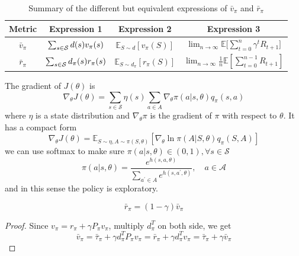 \documentclass[10pt]{elegantbook}
\begin{document}
\begin{table}[ht]
\centering
\caption{Summary of the different but equivalent expressions of $\bar{v}_{\pi}$ and $\bar r_{\pi}$}
\begin{tabular}{cccc}
\toprule
Metric & Expression 1 & Expression 2 & Expression 3 \\
\midrule
$\bar{v}_{\pi}$ & $\sum_{s\in{\cal S}}d(s)v_{\pi}(s)$       & $\mathbb{E}_{S\sim d}[v_{\pi}(S)]$        & $\lim_{n\rightarrow\infty}\mathbb{E} \big [ \sum_{t=0}^{n}\gamma^{t}R_{t+1} \big ]$ \\
\midrule
$\bar r_{\pi}$  & $\sum_{s\in{\cal S}}d_{\pi}(s)r_{\pi}(s)$ & $\mathbb E_{S\sim d_{\pi}}[r_{\pi}({S})]$ & $\operatorname*{lim}_{n\rightarrow\infty}\frac{1}{n} \mathbb E \left[\sum_{t=0}^{n-1}R_{t+1}\right]$ \\
\bottomrule
\end{tabular}
\end{table}

\begin{theorem}
    The gradient of $J(\theta)$ is
    \begin{equation}
        \nabla_{\theta}J(\theta)=\sum_{s\in{\mathcal{S}}}\eta(s)\sum_{a\in A}\nabla_{\theta}\pi(a|s,\theta)q_{\pi}(s,a)
    \end{equation}
    where $\eta$ is a state distribution and $\nabla_{\theta}\pi$ is the gradient of $\pi$ with respect to $\theta$. It has a compact form
    \begin{equation}
        \nabla_{\theta}J(\theta)=\mathbb{E}_{S\sim\eta,A\sim\pi(S,\theta)}\left[\nabla_{\theta}\ln\pi(A|S,\theta)q_{\pi}(S,A)\right]
    \end{equation}
    we can use softmax to make sure $\pi(a | s,\theta) \in (0, 1), \forall s \in \mathcal S$
    \begin{equation}
        \pi(a|s,\theta)=\frac{e^{h(s,a,\theta)}}{\sum_{a^{\prime}\in A}e^{h(s,a^{\prime},\theta)}},\quad a\in\mathcal{A}
    \end{equation}
    and in this sense the policy is exploratory.
\end{theorem}

\begin{lemma}
    \begin{equation}
        \bar{r}_{\pi}=(1-\gamma)\bar{v}_{\pi}
    \end{equation}
\end{lemma}

\begin{proof}
    Since $v_{\pi}=r_{\pi}+\gamma P_{\pi}v_{\pi}$, multiply $d_{\pi}^T$ on both side, we get
    \[ \bar{v}_{\pi}=\bar{\tau}_{\pi}+\gamma d_{\pi}^{T}{P}_{\pi}v_{\pi}=\bar{r}_{\pi}+\gamma d_{\pi}^{T}v_{\pi}=\bar{\tau}_{\pi}+\gamma\bar{v}_{\pi} \]
\end{proof}
\end{document}
